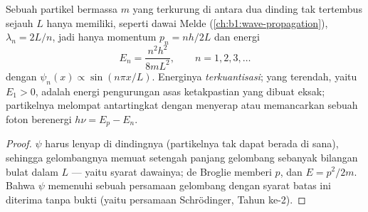\begin{proposition}\label{prop:b1:quantum-introduction:box}
Sebuah partikel bermassa $m$ yang terkurung di antara dua dinding tak tertembus sejauh
$L$ hanya memiliki, seperti dawai Melde
(\cref{ch:b1:wave-propagation}),  $\lambda_n = 2L/n$,
jadi hanya momentum $p_n = nh/2L$ dan energi
\[
E_n = \frac{n^2h^2}{8mL^2} , \qquad n = 1, 2, 3, \ldots
\]
dengan  $\psi_n(x) \propto \sin(n\pi x/L)$. Energinya
\emph{terkuantisasi}; yang terendah, yaitu \emph{} $E_1 > 0$, adalah
energi pengurungan asas ketakpastian yang dibuat eksak; partikelnya
melompat antartingkat dengan menyerap atau memancarkan sebuah foton
berenergi $h\nu = E_p - E_n$.
\end{proposition}

\begin{proof}
$\psi$ harus lenyap di dindingnya (partikelnya tak dapat berada di sana), sehingga
gelombangnya memuat setengah panjang gelombang sebanyak bilangan bulat dalam $L$ --- yaitu syarat
dawainya; de Broglie memberi $p$, dan $E = p^2/2m$. Bahwa $\psi$ memenuhi
sebuah persamaan gelombang dengan syarat batas ini diterima tanpa bukti (yaitu
persamaan Schrödinger, Tahun ke-2).
\end{proof}

